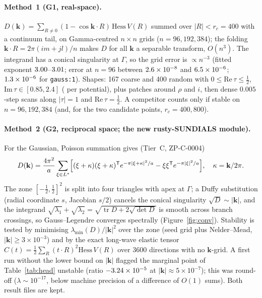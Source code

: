 \documentclass[10pt]{article}
\newcommand{\tr}{\operatorname{tr}}
\begin{document}
\paragraph{Method~1 (G1, real-space).} $D(\mathbf k)=\sum_{R\ne0}(1-\cos\mathbf k\!\cdot\!R)\,\mathrm{Hess}\,V(R)$ summed over $|R|<r_c=400$ with a continuum tail, on
Gamma-centred $n\times n$ grids ($n=96,192,384$); the folding $\mathbf k\!\cdot\!R=2\pi(im+jl)/n$ makes $D$ for all $\mathbf k$ a separable transform, $O(n^3)$. The integrand has a conical singularity at $\Gamma$,
so the grid error is $\propto n^{-3}$ (fitted exponent $3.00$--$3.01$; error at $n=96$ between $2.6\times10^{-8}$ and $6.5\times10^{-6}$; $1.3\times10^{-6}$ for \texttt{gauss:1}).
Shapes: 167 coarse and 400 random with $0\le\mathrm{Re}\,\tau\le\tfrac12$, $\mathrm{Im}\,\tau\in[0.85,2.4]$ (\ZPNScanPoints{} per potential), plus patches around $\rho$ and $i$, then dense $0.005$-step scans along $|\tau|=1$ and $\mathrm{Re}\,\tau=\tfrac12$.
A competitor counts only if stable on $n=96,192,384$ (and, for the two candidate points, $r_c=400,800$).

\paragraph{Method~2 (G2, reciprocal space; the new rusty-SUNDIALS module).} For the Gaussian, Poisson summation gives (Tier~C, ZP-C-0004)
\[D(\mathbf k)=\frac{4\pi^2}{a}\sum_{\xi\in L^*}\Bigl[(\xi+\kappa)(\xi+\kappa)^{\mathsf T}e^{-\pi|\xi+\kappa|^2/a}-\xi\xi^{\mathsf T}e^{-\pi|\xi|^2/a}\Bigr],\quad\kappa=\mathbf k/2\pi.\]
The zone $[-\tfrac12,\tfrac12]^2$ is split into four triangles with apex at $\Gamma$; a Duffy substitution (radial coordinate $s$, Jacobian $s/2$) cancels the conical singularity $\sqrt D\sim|\mathbf k|$, and the integrand
$\sqrt{\lambda_1}+\sqrt{\lambda_2}=\sqrt{\tr D+2\sqrt{\det D}}$ is smooth across branch crossings, so Gauss--Legendre converges spectrally (Figure~\ref{fig:conv}).
Stability is tested by minimising $\lambda_{\min}(D)/|\mathbf k|^2$ over the zone (seed grid plus Nelder--Mead, $|\mathbf k|\ge3\times10^{-3}$) and by the exact long-wave elastic tensor
$C(t)=\tfrac12\sum_R(t\!\cdot\!R)^2\mathrm{Hess}\,V(R)$ over 3600 directions with no $\mathbf k$-grid. A first run without the lower bound on $|\mathbf k|$ flagged the marginal point of Table~\ref{tab:head}
unstable (ratio $-3.24\times10^{-5}$ at $|\mathbf k|\approx5\times10^{-7}$); this was round-off ($\lambda\sim10^{-17}$, below machine precision of a difference of $O(1)$ sums). Both result files are kept.
\end{document}
